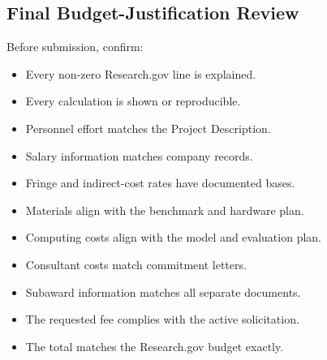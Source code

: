 \documentclass[11pt,letterpaper]{article}
\begin{document}
\subsection*{Final Budget-Justification Review}

Before submission, confirm:

\begin{itemize}
    \item[$\square$] Every non-zero Research.gov line is explained.
    \item[$\square$] Every calculation is shown or reproducible.
    \item[$\square$] Personnel effort matches the Project Description.
    \item[$\square$] Salary information matches company records.
    \item[$\square$] Fringe and indirect-cost rates have documented bases.
    \item[$\square$] Materials align with the benchmark and hardware plan.
    \item[$\square$] Computing costs align with the model and evaluation plan.
    \item[$\square$] Consultant costs match commitment letters.
    \item[$\square$] Subaward information matches all separate documents.
    \item[$\square$] The requested fee complies with the active solicitation.
    \item[$\square$] The total matches the Research.gov budget exactly.
\end{itemize}
\end{document}
